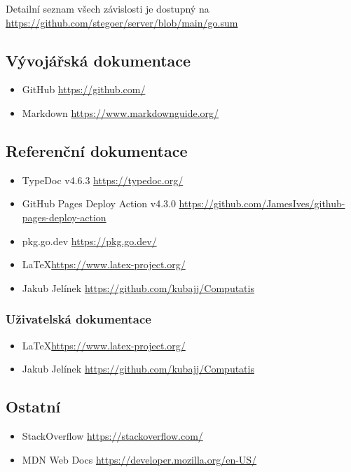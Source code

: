 Detailní seznam všech závislosti je dostupný na
\url{https://github.com/stegoer/server/blob/main/go.sum}

\subsection{Vývojářská dokumentace}\label{subsec:dev-dokumentace}

\begin{itemize}
    \item GitHub \url{https://github.com/}
    \item Markdown \url{https://www.markdownguide.org/}
\end{itemize}

\subsection{Referenční dokumentace}\label{subsec:ref-dokumentace}

\begin{itemize}
    \item TypeDoc v4.6.3 \url{https://typedoc.org/}
    \item GitHub Pages Deploy Action v4.3.0 \url{https://github.com/JamesIves/github-pages-deploy-action}
    \item pkg.go.dev \url{https://pkg.go.dev/}
    \item \LaTeX \url{https://www.latex-project.org/}
    \item Jakub Jelínek \url{https://github.com/kubajj/Computatis}
\end{itemize}

\subsubsection{Uživatelská dokumentace}\label{subsec:user-dokumentace}

\begin{itemize}
    \item \LaTeX \url{https://www.latex-project.org/}
    \item Jakub Jelínek \url{https://github.com/kubajj/Computatis}
\end{itemize}

\subsection{Ostatní}\label{subsec:ostatni}

\begin{itemize}
    \item StackOverflow \url{https://stackoverflow.com/}
    \item MDN Web Docs \url{https://developer.mozilla.org/en-US/}
\end{itemize}
